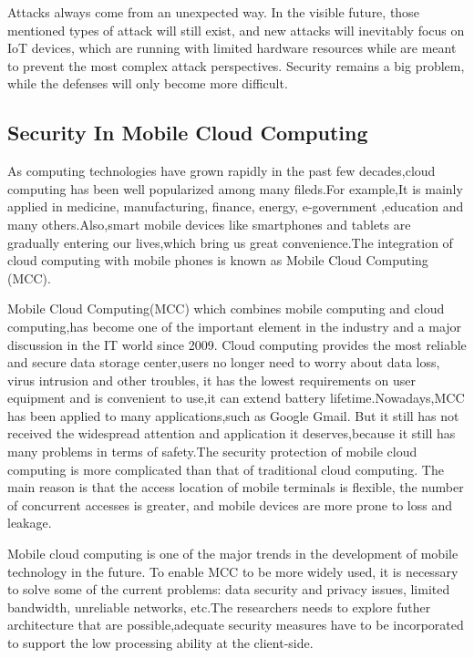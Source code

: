 \documentclass[conference]{IEEEtran}
\begin{document}
Attacks always come from an unexpected way. In the visible future, those mentioned types of attack will still exist, and new attacks will inevitably focus on IoT devices, which are running with limited hardware resources while are meant to prevent the most complex attack perspectives. Security remains a big problem, while the defenses will only become more difficult. 
\subsection{Security In Mobile Cloud Computing}
As computing technologies have grown rapidly in the past few decades,cloud computing has been well popularized among many fileds.For example,It is mainly applied in medicine, manufacturing, finance, energy, e-government ,education and many others.Also,smart mobile devices like smartphones and tablets are gradually entering our lives,which bring us great convenience.The integration of cloud computing with mobile phones is known as Mobile Cloud Computing (MCC).\cite{zxy-1}

Mobile Cloud Computing(MCC) which combines mobile computing and cloud computing,has become one of the important element in the industry and a major discussion in the IT world since 2009.\cite{zxy-2} Cloud computing provides the most reliable and secure data storage center,users no longer need to worry about data loss, virus intrusion and other troubles, it has the lowest requirements on user equipment and is convenient to use,it can extend battery lifetime.Nowadays,MCC has been applied to many applications,such as Google Gmail. But it still has not received the widespread attention and application it deserves,because it still has many problems in terms of safety.The security protection of mobile cloud computing is more complicated than that of traditional cloud computing. The main reason is that the access location of mobile terminals is flexible, the number of concurrent accesses is greater, and mobile devices are more prone to loss and leakage.

Mobile cloud computing is one of the major trends in the development of mobile technology in the future. To enable MCC to be more widely used, it is necessary to solve some of the current problems: data security and privacy issues, limited bandwidth, unreliable networks, etc.The researchers needs to explore futher architecture that are possible,adequate security measures have to be incorporated to support the low processing ability at the client-side.\cite{zxy-2} 


\printbibliography
\end{document}
